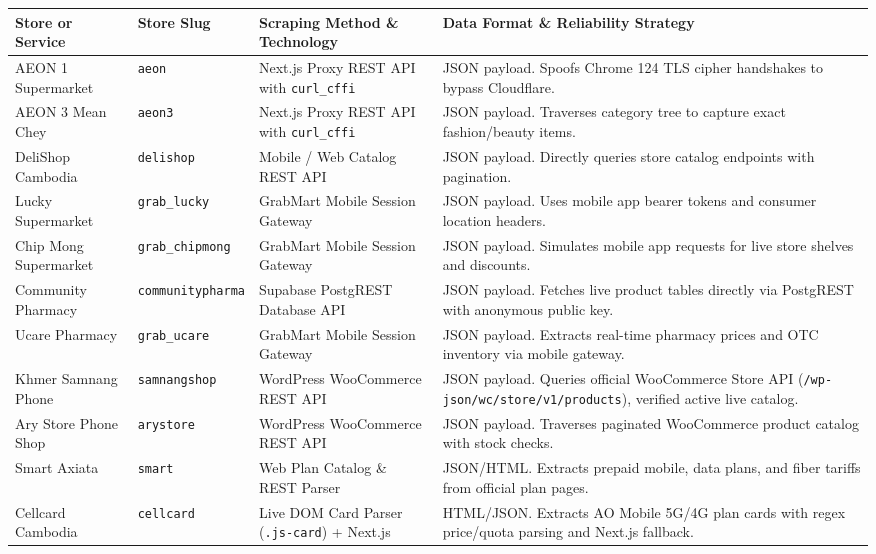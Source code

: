 \documentclass[11pt,a4paper,oneside]{article}
\begin{document}
\begin{longtable}{p{3.2cm}p{2.2cm}p{4.6cm}p{4.6cm}}
\toprule
\textbf{Store or Service} & \textbf{Store Slug} & \textbf{Scraping Method \& Technology} & \textbf{Data Format \& Reliability Strategy} \\
\midrule
\endhead
AEON 1 Supermarket & \texttt{aeon} & Next.js Proxy REST API with \texttt{curl\_cffi} & JSON payload. Spoofs Chrome 124 TLS cipher handshakes to bypass Cloudflare. \\
AEON 3 Mean Chey & \texttt{aeon3} & Next.js Proxy REST API with \texttt{curl\_cffi} & JSON payload. Traverses category tree to capture exact fashion/beauty items. \\
DeliShop Cambodia & \texttt{delishop} & Mobile / Web Catalog REST API & JSON payload. Directly queries store catalog endpoints with pagination. \\
Lucky Supermarket & \texttt{grab\_lucky} & GrabMart Mobile Session Gateway & JSON payload. Uses mobile app bearer tokens and consumer location headers. \\
Chip Mong Supermarket & \texttt{grab\_chipmong} & GrabMart Mobile Session Gateway & JSON payload. Simulates mobile app requests for live store shelves and discounts. \\
Community Pharmacy & \texttt{communitypharma} & Supabase PostgREST Database API & JSON payload. Fetches live product tables directly via PostgREST with anonymous public key. \\
Ucare Pharmacy & \texttt{grab\_ucare} & GrabMart Mobile Session Gateway & JSON payload. Extracts real-time pharmacy prices and OTC inventory via mobile gateway. \\
Khmer Samnang Phone & \texttt{samnangshop} & WordPress WooCommerce REST API & JSON payload. Queries official WooCommerce Store API (\texttt{/wp-json/wc/store/v1/products}), verified active live catalog. \\
Ary Store Phone Shop & \texttt{arystore} & WordPress WooCommerce REST API & JSON payload. Traverses paginated WooCommerce product catalog with stock checks. \\
Smart Axiata & \texttt{smart} & Web Plan Catalog \& REST Parser & JSON/HTML. Extracts prepaid mobile, data plans, and fiber tariffs from official plan pages. \\
Cellcard Cambodia & \texttt{cellcard} & Live DOM Card Parser (\texttt{.js-card}) + Next.js & HTML/JSON. Extracts AO Mobile 5G/4G plan cards with regex price/quota parsing and Next.js fallback. \\

\end{longtable}
\end{document}

